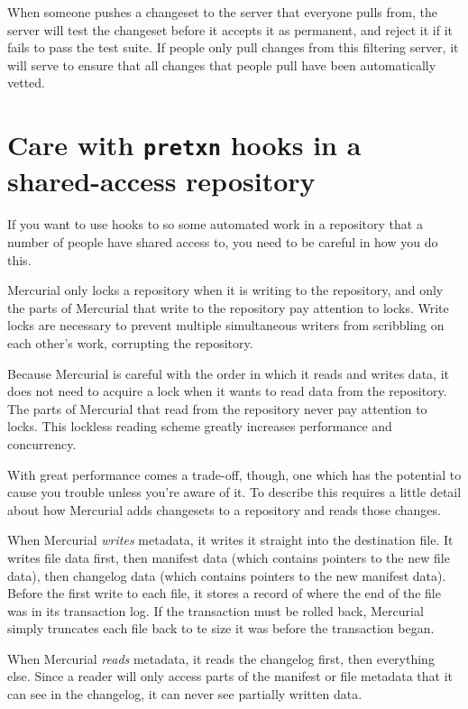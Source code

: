 When someone pushes a changeset to the server that everyone pulls
from, the server will test the changeset before it accepts it as
permanent, and reject it if it fails to pass the test suite.  If
people only pull changes from this filtering server, it will serve to
ensure that all changes that people pull have been automatically
vetted.

\section{Care with \texttt{pretxn} hooks in a shared-access repository}

If you want to use hooks to so some automated work in a repository
that a number of people have shared access to, you need to be careful
in how you do this.

Mercurial only locks a repository when it is writing to the
repository, and only the parts of Mercurial that write to the
repository pay attention to locks.  Write locks are necessary to
prevent multiple simultaneous writers from scribbling on each other's
work, corrupting the repository.

Because Mercurial is careful with the order in which it reads and
writes data, it does not need to acquire a lock when it wants to read
data from the repository.  The parts of Mercurial that read from the
repository never pay attention to locks.  This lockless reading scheme
greatly increases performance and concurrency.

With great performance comes a trade-off, though, one which has the
potential to cause you trouble unless you're aware of it.  To describe
this requires a little detail about how Mercurial adds changesets to a
repository and reads those changes.

When Mercurial \emph{writes} metadata, it writes it straight into the
destination file.  It writes file data first, then manifest data
(which contains pointers to the new file data), then changelog data
(which contains pointers to the new manifest data).  Before the first
write to each file, it stores a record of where the end of the file
was in its transaction log.  If the transaction must be rolled back,
Mercurial simply truncates each file back to te size it was before the
transaction began.

When Mercurial \emph{reads} metadata, it reads the changelog first,
then everything else.  Since a reader will only access parts of the
manifest or file metadata that it can see in the changelog, it can
never see partially written data.

